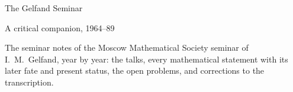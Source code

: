 \documentclass[11pt,oneside]{book}
\begin{document}
\begin{titlepage}\centering\vspace*{6em}
{\Huge The Gelfand Seminar\par}\vspace{1em}
{\Large A critical companion, 1964–89\par}\vspace{2em}
{\large The seminar notes of the Moscow Mathematical Society seminar of I.~M.~Gelfand, year by year: the talks, every mathematical statement with its later fate and present status, the open problems, and corrections to the transcription.\par}
\end{titlepage}
\tableofcontents
























\end{document}

